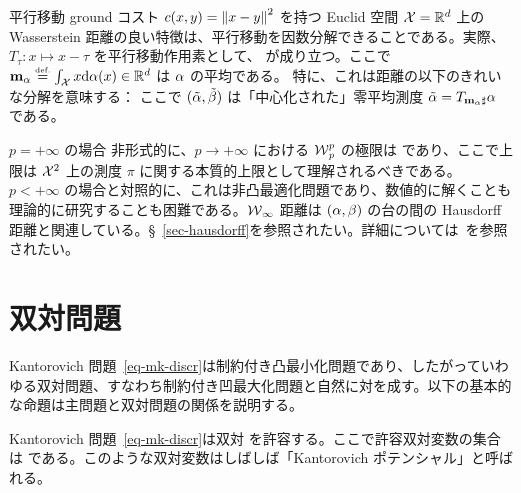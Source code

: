 \begin{rem1}{平行移動}
ground コスト $c(x,y)=\left\| x-y \right\|^2$ を持つ Euclid 空間 $\mathcal{X}=\mathbb{R}^d$ 上の Wasserstein 距離の良い特徴は、平行移動を因数分解できることである。実際、$T_{\tau} : x \mapsto x-\tau$ を平行移動作用素として、
が成り立つ。ここで $\mathbf{m}_{\alpha} \stackrel{\mbox{\upshape\tiny def.}}{=} \int_{\mathcal{X}} x \mathrm{d}\alpha(x) \in \mathbb{R}^d$ は $\alpha$ の平均である。
%
特に、これは距離の以下のきれいな分解を意味する：
ここで $(\tilde{\alpha},\tilde{\beta})$ は「中心化された」零平均測度 $\tilde{\alpha}=T_{\mathbf{m}_{\alpha}\sharp}\alpha$ である。
\end{rem1}
\pagebreak
\begin{rem1}{$p = +\infty$ の場合}\label{rem-p-inf}
非形式的に、$p \rightarrow +\infty$ における $\operatorname{\mathcal{W}}_p^p$ の極限は
であり、ここで上限は $\mathcal{X}^2$ 上の測度 $\pi$ に関する本質的上限として理解されるべきである。
%
$p<+\infty$ の場合と対照的に、これは非凸最適化問題であり、数値的に解くことも理論的に研究することも困難である。$\operatorname{\mathcal{W}}_{\infty}$ 距離は $(\alpha,\beta)$ の台の間の Hausdorff 距離と関連している。\S~\ref{sec-hausdorff}を参照されたい。詳細については~\citep{champion2008wasserstein}を参照されたい。
\end{rem1}



\section{双対問題}

Kantorovich 問題~\eqref{eq-mk-discr}は制約付き凸最小化問題であり、したがっていわゆる双対問題、すなわち制約付き凹最大化問題と自然に対を成す。以下の基本的な命題は主問題と双対問題の関係を説明する。

\begin{prop}\label{prop-duality-discr}
Kantorovich 問題~\eqref{eq-mk-discr}は双対
\eql{\label{eq-dual}
	\MKD_\C(\a,\b) =
	\umax{(\fD,\gD) \in \PotentialsD(\C)} \dotp{\fD}{\a} + \dotp{\gD}{\b}
}
を許容する。ここで許容双対変数の集合は
である。このような双対変数はしばしば「Kantorovich ポテンシャル」と呼ばれる。
\end{prop}

